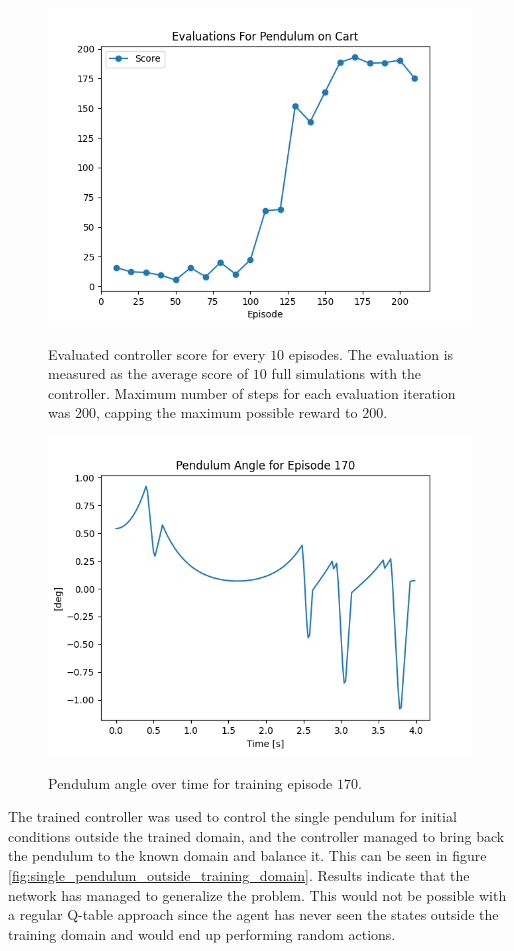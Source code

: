\documentclass{LTHtwocol} %
\begin{document}
\begin{figure}[H]
	\centering
	\includegraphics[width=0.9\columnwidth]{figures/SinglePendulum_eval.png}
	\label{fig:single_pendulum_eval}
	\caption{Evaluated controller score for every $10$ episodes. The evaluation is measured as the average score of $10$ full simulations with the controller. Maximum number of steps for each evaluation iteration was $200$, capping the maximum possible reward to $200$.}
\end{figure}

\begin{figure}[H]
	\centering
	\includegraphics[width=0.9\columnwidth]{figures/Pendulum_angle.png}
	\label{fig:single_pendulum_angle}
	\caption{Pendulum angle over time for training episode $170$.}
\end{figure}

The trained controller was used to control the single pendulum for initial conditions outside the trained domain, and the controller managed to bring back the pendulum to the known domain and balance it.
This can be seen in figure \ref{fig:single_pendulum_outside_training_domain}.
Results indicate that the network has managed to generalize the problem.
This would not be possible with a regular Q-table approach since the agent has never seen the states outside the training domain and would end up performing random actions.
\end{document}
